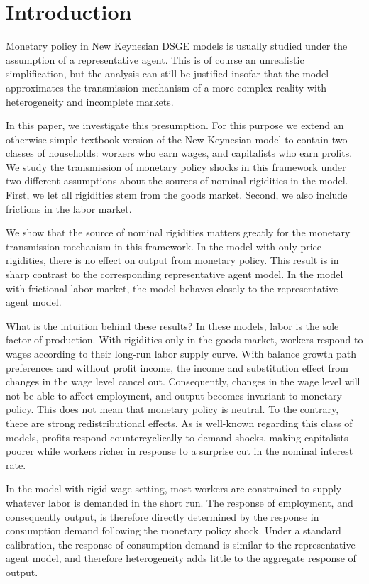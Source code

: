 \section{Introduction}

Monetary policy in New Keynesian DSGE models is usually studied under the assumption of a representative agent. This is of course an unrealistic simplification, but the analysis can still be justified insofar that the model approximates the transmission mechanism of a more complex reality with heterogeneity and incomplete markets. 

In this paper, we investigate this presumption. For this purpose we extend an otherwise simple textbook version of the New Keynesian model to contain two classes of households: workers who earn wages, and capitalists who earn profits. We study the transmission of monetary policy shocks in this framework under two different assumptions about the sources of nominal rigidities in the model. First, we let all rigidities stem from the goods market. Second, we also include frictions in the labor market. 

We show that the source of nominal rigidities matters greatly for the monetary transmission mechanism in this framework. In the model with only price rigidities, there is no effect on output from monetary policy. This result is in sharp contrast to the corresponding representative agent model. In the model with frictional labor market, the model behaves closely to the representative agent model.

What is the intuition behind these results? In these models, labor is the sole factor of production. With rigidities only in the goods market, workers respond to wages according to their long-run labor supply curve. With balance growth path preferences and without profit income, the income and substitution effect from changes in the wage level cancel out. Consequently, changes in the wage level will not be able to affect employment, and output becomes invariant to monetary policy. This does not mean that monetary policy is neutral. To the contrary, there are strong redistributional effects. As is well-known regarding this class of models, profits respond countercyclically to demand shocks, making capitalists poorer while workers richer in response to a surprise cut in the nominal interest rate.

In the model with rigid wage setting, most workers are constrained to supply whatever labor is demanded in the short run. The response of employment, and consequently output, is therefore directly determined by the response in consumption demand following the monetary policy shock. Under a standard calibration, the response of consumption demand is similar to the representative agent model, and therefore heterogeneity adds little to the aggregate response of output.   

